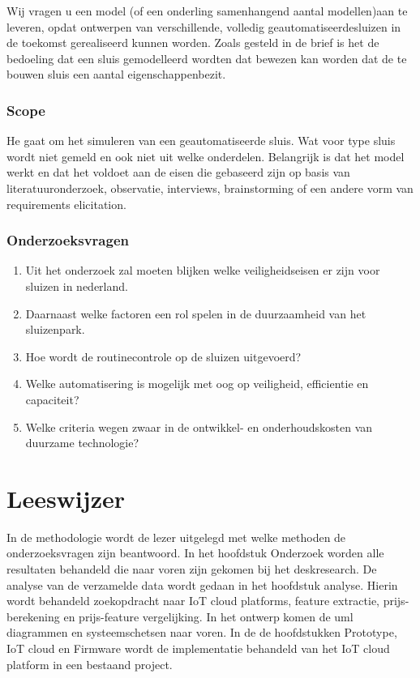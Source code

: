 Wij vragen u een model (of een onderling samenhangend aantal modellen)aan  te  leveren,  opdat  ontwerpen  van  verschillende,  volledig  geautomatiseerdesluizen in de toekomst gerealiseerd kunnen worden. 
Zoals  gesteld  in  de  brief  is  het  de  bedoeling  dat  een  sluis  gemodelleerd  wordten  dat  bewezen  kan  worden  dat  de  te  bouwen  sluis  een  aantal  eigenschappenbezit.  

\subsubsection{Scope}

He gaat om het simuleren van een geautomatiseerde sluis. Wat voor type sluis wordt niet gemeld en ook niet uit welke onderdelen. Belangrijk is dat het model werkt en dat het voldoet aan de eisen die gebaseerd zijn op basis van literatuuronderzoek, observatie, interviews, brainstorming of een andere vorm van requirements elicitation.

\subsubsection{Onderzoeksvragen }






\begin{enumerate}
	\item Uit het onderzoek zal moeten blijken welke veiligheidseisen er zijn voor sluizen in nederland. 
	\item Daarnaast welke factoren een rol spelen in de duurzaamheid van het sluizenpark.  
	\item Hoe wordt de routinecontrole op de sluizen uitgevoerd?  
	\item Welke automatisering is mogelijk met oog op veiligheid, efficientie en capaciteit?  
	\item Welke criteria wegen zwaar in de ontwikkel- en onderhoudskosten van duurzame technologie?
\end{enumerate}





\section{Leeswijzer}
In  de methodologie wordt de lezer uitgelegd met welke methoden de onderzoeksvragen zijn beantwoord. In het hoofdstuk Onderzoek worden alle resultaten behandeld die naar voren zijn gekomen bij het deskresearch. De analyse van de verzamelde data wordt gedaan in het hoofdstuk analyse. Hierin wordt behandeld zoekopdracht naar IoT cloud platforms, feature extractie, prijs-berekening en prijs-feature vergelijking. In het ontwerp komen de uml diagrammen en systeemschetsen naar voren. In de  de hoofdstukken Prototype, IoT cloud en Firmware wordt de implementatie behandeld van het IoT cloud platform in een bestaand project.





